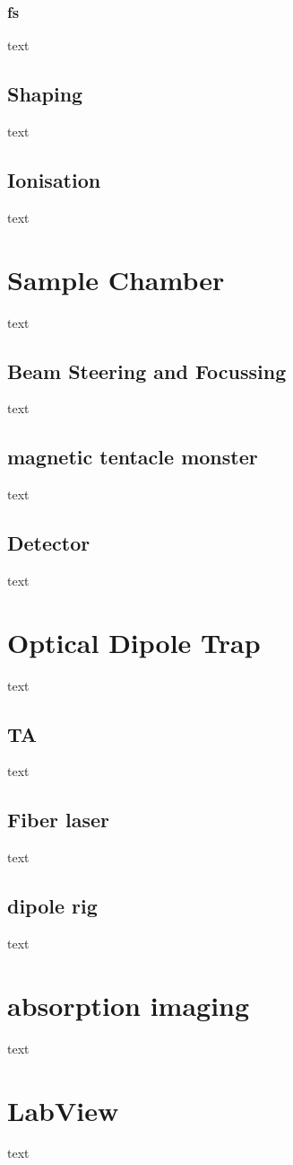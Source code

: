         \subsubsection{fs}
text
    \subsection{Shaping}
text
    \subsection{Ionisation}
text
\section{Sample Chamber}
text
    \subsection{Beam Steering and Focussing}
text
    \subsection{magnetic tentacle monster}
text
    \subsection{Detector}
text
\section{Optical Dipole Trap}
text
    \subsection{TA}
text
    \subsection{Fiber laser}
text
    \subsection{dipole rig}
text
\section{absorption imaging}
text
\section{LabView}
text

